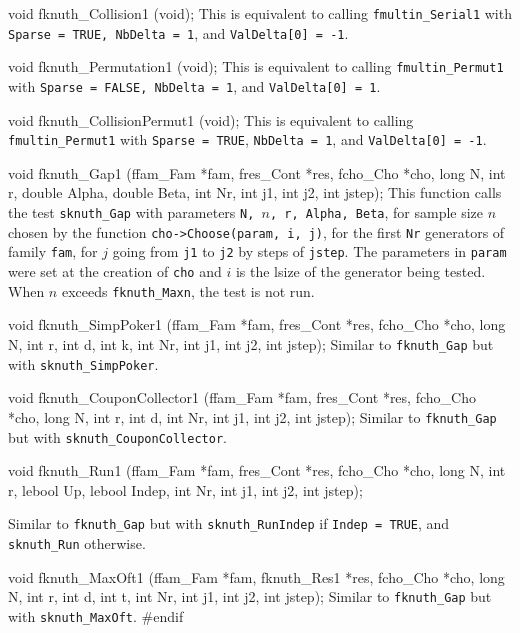 void fknuth_Collision1 (void);
\endcode
\tab This is equivalent to calling {\tt fmultin\_Serial1} with 
  {\tt Sparse = TRUE, NbDelta = 1}, and {\tt Val\-Delta[0] = -1}.
 \endtab
\code


void fknuth_Permutation1 (void);
\endcode
\tab This is equivalent to  calling {\tt fmultin\_Permut1} with 
  {\tt Sparse = FALSE, NbDelta = 1}, and
  {\tt Val\-Delta[0] = 1}.
 \endtab
\code


void fknuth_CollisionPermut1 (void);
\endcode
\tab This is equivalent to  calling {\tt fmultin\_Permut1} with 
  {\tt Sparse = TRUE},  {\tt NbDelta = 1},  and {\tt Val\-Delta[0] = -1}.
 \endtab
\code


void fknuth_Gap1 (ffam_Fam *fam, fres_Cont *res, fcho_Cho *cho,
                  long N, int r, double Alpha, double Beta,
                  int Nr, int j1, int j2, int jstep);
\endcode
\tab
 This function calls the test {\tt sknuth\_Gap} with parameters
 {\tt N, $n$, r, Alpha, Beta}, for sample size $n$ chosen by the function
 {\tt cho->Choose(param, i, j)},
 for the first {\tt Nr} generators of family {\tt fam}, for $j$ going from
 {\tt j1} to {\tt j2} by steps of {\tt jstep}. The parameters in {\tt param}
 were set at the creation of {\tt cho} and $i$ is the lsize of the
 generator being tested.
 When $n$ exceeds {\tt fknuth\_Maxn}, the test is not run.
\endtab
\code


void fknuth_SimpPoker1 (ffam_Fam *fam, fres_Cont *res, fcho_Cho *cho,
                        long N, int r, int d, int k,
                        int Nr, int j1, int j2, int jstep);
\endcode
  \tab Similar to {\tt fknuth\_Gap} but with {\tt sknuth\_SimpPoker}.
  \endtab
\code


void fknuth_CouponCollector1 (ffam_Fam *fam, fres_Cont *res, fcho_Cho *cho,
                              long N, int r, int d,
                              int Nr, int j1, int j2, int jstep);
\endcode
  \tab Similar to {\tt fknuth\_Gap} but with {\tt sknuth\_CouponCollector}.
 \endtab
\code


void fknuth_Run1 (ffam_Fam *fam, fres_Cont *res, fcho_Cho *cho,
                  long N, int r, lebool Up, lebool Indep,
                  int Nr, int j1, int j2, int jstep);

\endcode
  \tab Similar to {\tt fknuth\_Gap} but with {\tt sknuth\_RunIndep}
  if {\tt Indep = TRUE}, and {\tt sknuth\_Run} otherwise.
 \endtab
\code


void fknuth_MaxOft1 (ffam_Fam *fam, fknuth_Res1 *res, fcho_Cho *cho,
                     long N, int r, int d, int t,
                     int Nr, int j1, int j2, int jstep);
\endcode
  \tab Similar to {\tt fknuth\_Gap} but with {\tt sknuth\_MaxOft}.
 \endtab
\code\hide
#endif
\endhide\endcode
